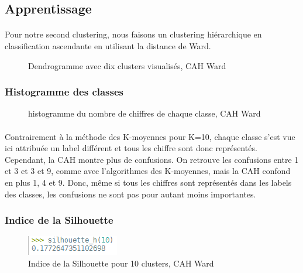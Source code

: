 \documentclass{article}
\begin{document}
    \subsection{Apprentissage}
    \paragraph{}\paragraph{}Pour notre second clustering, nous faisons un clustering hiérarchique en classification ascendante en utilisant la distance de Ward.
    \begin{figure}[H]
        \centering
        
         \caption{Dendrogramme avec dix clusters visualisés, CAH Ward}
        \end{figure}
        \subsubsection{Histogramme des classes}
        \begin{figure}[H]
            \centering
            \caption{histogramme du nombre de chiffres de chaque classe, CAH Ward}
        \end{figure}
        \paragraph{}Contrairement à la méthode des K-moyennes pour K=10, chaque classe s'est vue ici attribuée un label différent et tous les chiffre sont donc représentés. Cependant, la CAH montre plus de confusions. On retrouve les confusions entre  1 et 3 et 3 et 9, comme avec l'algorithmes des K-moyennes, mais la CAH confond en plus 1, 4 et 9. Donc, même si tous les chiffres sont représentés dans les labels des classes, les confusions ne sont pas pour autant moins importantes.
        \subsubsection{Indice de la Silhouette}
        \begin{figure}[H]
            \centering
            \includegraphics{silhouette_h(10).PNG}
            \caption{Indice de la Silhouette pour 10 clusters, CAH Ward}
        \end{figure}
\end{document}
